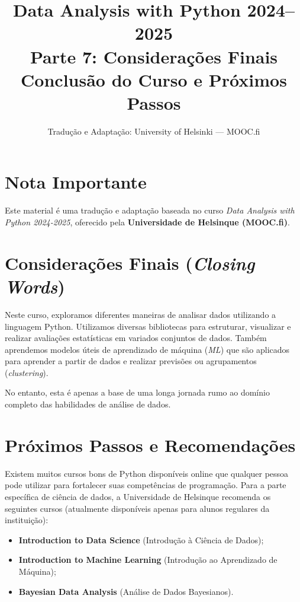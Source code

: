 \documentclass[11pt,a4paper]{article}
\title{\textbf{Data Analysis with Python 2024--2025}\\Parte 7: Considerações Finais\\\large Conclusão do Curso e Próximos Passos}
\author{Tradução e Adaptação: University of Helsinki --- MOOC.fi}
\date{}
\begin{document}
\maketitle

\section*{Nota Importante}
Este material é uma tradução e adaptação baseada no curso \textit{Data Analysis with Python 2024-2025}, oferecido pela \textbf{Universidade de Helsinque (MOOC.fi)}.

\tableofcontents
\newpage

\section{Considerações Finais (\emph{Closing Words})}

Neste curso, exploramos diferentes maneiras de analisar dados utilizando a linguagem Python. Utilizamos diversas bibliotecas para estruturar, visualizar e realizar avaliações estatísticas em variados conjuntos de dados. Também aprendemos modelos úteis de aprendizado de máquina (\emph{ML}) que são aplicados para aprender a partir de dados e realizar previsões ou agrupamentos (\emph{clustering}). 

No entanto, esta é apenas a base de uma longa jornada rumo ao domínio completo das habilidades de análise de dados.

\section{Próximos Passos e Recomendações}

Existem muitos cursos bons de Python disponíveis online que qualquer pessoa pode utilizar para fortalecer suas competências de programação. Para a parte específica de ciência de dados, a Universidade de Helsinque recomenda os seguintes cursos (atualmente disponíveis apenas para alunos regulares da instituição):

\begin{itemize}
    \item \textbf{Introduction to Data Science} (Introdução à Ciência de Dados);
    \item \textbf{Introduction to Machine Learning} (Introdução ao Aprendizado de Máquina);
    \item \textbf{Bayesian Data Analysis} (Análise de Dados Bayesianos).
\end{itemize}
\end{document}

